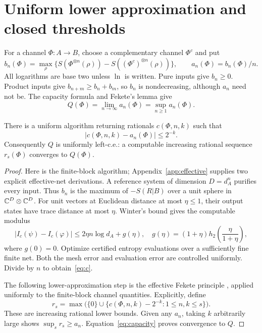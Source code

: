 \section{Uniform lower approximation and closed thresholds}\label{sec:hierarchy}
For a channel $\Phi:A\to B$, choose a complementary channel $\Phi^c$ and put
\[
 b_n(\Phi)=\max_{\rho} \{S(\Phi^{\otimes n}(\rho))
                  -S((\Phi^c)^{\otimes n}(\rho))\},\qquad
 a_n(\Phi)=b_n(\Phi)/n.
\]
All logarithms are base two unless $\ln$ is written. Pure inputs give
$b_n\geq0$. Product inputs give $b_{n+m}\geq b_n+b_m$, so
$b_n$ is nondecreasing, although $a_n$ need not be. The capacity formula
and Fekete's lemma give
\begin{equation}\label{eq:capacity}
 Q(\Phi)=\lim_{n\to\infty}a_n(\Phi)=\sup_{n\geq1}a_n(\Phi).
\end{equation}

\begin{theorem}\label{thm:uniform}
There is a uniform algorithm returning rationals $c(\Phi,n,k)$ such that
\begin{equation}\label{eq:c}
 |c(\Phi,n,k)-a_n(\Phi)|\leq2^{-k}.
\end{equation}
Consequently $Q$ is uniformly left-c.e.: a computable increasing rational
sequence $r_s(\Phi)$ converges to $Q(\Phi)$.
\end{theorem}
\begin{proof}
Here is the finite-block algorithm; Appendix~\ref{app:effective} supplies
two explicit effective-net derivations. A reference system of dimension
$D=d_A^n$ purifies every input. Thus $b_n$ is the maximum of
$-S(R|B)$ over a unit sphere in $\mathbb C^D\otimes\mathbb C^D$.
For unit vectors at Euclidean distance at most $\eta\leq1$, their output
states have trace distance at most $\eta$. Winter's bound gives the
computable modulus
\begin{equation}\label{eq:modulus}
 |I_c(\psi)-I_c(\varphi)|\leq
 2\eta n\log d_A+g(\eta),\quad
 g(\eta)=(1+\eta)h_2\!\left(\frac{\eta}{1+\eta}\right),
\end{equation}
where $g(0)=0$. Optimize certified entropy evaluations over a sufficiently
fine finite net. Both the mesh error and evaluation error are controlled
uniformly. Divide by $n$ to obtain~\eqref{eq:c}.

The following lower-approximation step is the effective Fekete principle
\cite[Lemmas~17--19 and Theorem~21]{BBD}, applied uniformly to the
finite-block channel quantities. Explicitly, define
\begin{equation}\label{eq:rs}
 r_s=\max\bigl(\{0\}\cup
 \{c(\Phi,n,k)-2^{-k}:1\leq n,k\leq s\}\bigr).
\end{equation}
These are increasing rational lower bounds. Given any $a_n$, taking
$k$ arbitrarily large shows $\sup_s r_s\geq a_n$.
Equation~\eqref{eq:capacity} proves convergence to $Q$.
\end{proof}

